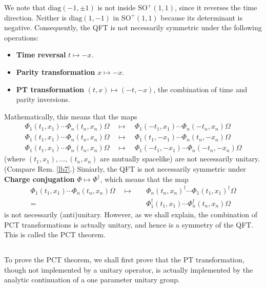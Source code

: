 \documentclass[12pt,b5paper,notitlepage]{article}
\theoremstyle{definition}
\theoremstyle{plain}
\newcommand{\diag}{\mathrm{diag}}
\newcommand{\SO}{\mathrm{SO}}
\numberwithin{equation}{section}
\begin{document}
We note that $\diag(-1,\pm 1)$ is not inside $\SO^+(1,1)$, since it reverses the time direction. Neither is $\diag(1,-1)$ in $\SO^+(1,1)$ because its determinant is negative. Consequently, the QFT is not necessarily symmetric under the following operations:
\begin{itemize}
\item \textbf{{\color{red}T}ime reversal}   $t\mapsto -x$.
\item \textbf{{\color{red}P}arity transformation}  $x\mapsto -x$.
\item \textbf{{\color{red}PT} transformation}  $(t,x)\mapsto (-t,-x)$, the combination of time and parity inversions.
\end{itemize} 
Mathematically, this means that the maps
\begin{gather*}
\Phi_1(t_1,x_1)\cdots \Phi_n(t_n,x_n)\Omega\quad\mapsto\quad \Phi_1(-t_1,x_1)\cdots \Phi_n(-t_n,x_n)\Omega\\
\Phi_1(t_1,x_1)\cdots \Phi_n(t_n,x_n)\Omega\quad\mapsto\quad \Phi_1(t_1,-x_1)\cdots \Phi_n(t_n,-x_n)\Omega\\
\Phi_1(t_1,x_1)\cdots \Phi_n(t_n,x_n)\Omega\quad\mapsto\quad \Phi_1(-t_1,-x_1)\cdots \Phi_n(-t_n,-x_n)\Omega
\end{gather*}
(where $(t_1,x_1),\dots,(t_n,x_n)$ are mutually spacelike) are not necessarily unitary. (Compare Rem. \ref{lb7}.) Simiarly, the QFT is not necessarily symmetric under \textbf{{\color{red}C}harge conjugation} $\Phi\mapsto\Phi^\dagger$, which means that the map
\begin{align*}
\Phi_1(t_1,x_1)\cdots \Phi_n(t_n,x_n)\Omega\quad\mapsto\quad &\Phi_n(t_n,x_n)^\dagger\cdots \Phi_1(t_1,x_1)^\dagger\Omega\\
=&\Phi_1^\dagger(t_1,x_1)\cdots\Phi_n^\dagger(t_n,x_n)\Omega
\end{align*}
is not necessarily (anti)unitary. However, as we shall explain, the combination of PCT transformations is actually unitary, and hence is a symmetry of the QFT. This is called the PCT theorem.

\subsection{}


To prove the PCT theorem, we shall first prove that the PT transformation, though not implemented by a unitary operator, is actually implemented by the analytic continuation of a one parameter unitary group.
\end{document}
